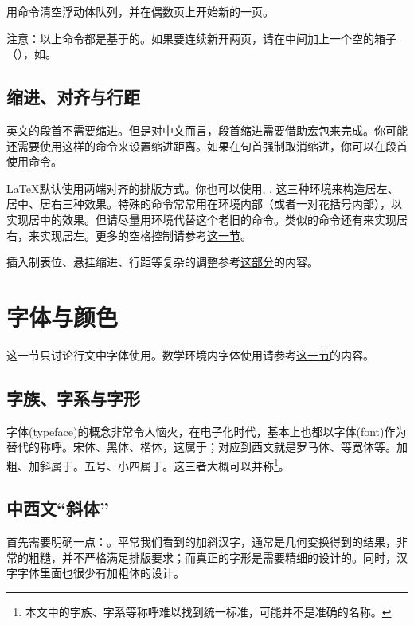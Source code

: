 用命令清空浮动体队列，并在偶数页上开始新的一页。

注意：以上命令都是基于的。如果要连续新开两页，请在中间加上一个空的箱子（），如。

\subsection{缩进、对齐与行距}
英文的段首不需要缩进。但是对中文而言，段首缩进需要借助宏包来完成。你可能还需要使用这样的命令来设置缩进距离。如果在句首强制取消缩进，你可以在段首使用命令。

\LaTeX 默认使用两端对齐的排版方式。你也可以使用, , 这三种环境来构造居左、居中、居右三种效果。特殊的命令常常用在环境内部（或者一对花括号内部），以实现居中的效果。但请尽量用环境代替这个老旧的命令。类似的命令还有来实现居右，来实现居左。更多的空格控制请参考\hyperref[sec:hvspace]{这一节}。

插入制表位、悬挂缩进、行距等复杂的调整参考\hyperref[sec:hvspace]{这部分}的内容。

\section{字体与颜色}
\label{sec:font}
这一节只讨论行文中字体使用。数学环境内字体使用请参考\hyperref[sec:mathfont]{这一节}的内容。

\subsection{字族、字系与字形}
字体(typeface)的概念非常令人恼火，在电子化时代，基本上也都以字体(font)作为替代的称呼。宋体、黑体、楷体，这属于；对应到西文就是罗马体、等宽体等。加粗、加斜属于。五号、小四属于。这三者大概可以并称\footnote{本文中的字族、字系等称呼难以找到统一标准，可能并不是准确的名称。}。

\subsection{中西文“斜体”}
首先需要明确一点：。平常我们看到的加斜汉字，通常是几何变换得到的结果，非常的粗糙，并不严格满足排版要求；而真正的字形是需要精细的设计的。同时，汉字字体里面也很少有加粗体的设计。

